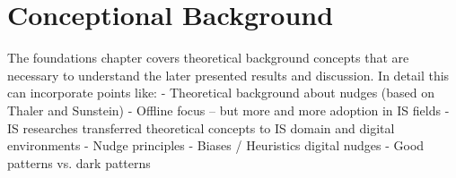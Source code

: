 \section{Conceptional Background}
The foundations chapter covers theoretical background concepts that are necessary to understand the later presented results and discussion. In detail this can incorporate points like:
-	Theoretical background about nudges (based on Thaler and Sunstein)
-	Offline focus – but more and more adoption in IS fields
-	IS researches transferred theoretical concepts to IS domain and digital environments
-	Nudge principles
-	Biases / Heuristics digital nudges
-	Good patterns vs. dark patterns
